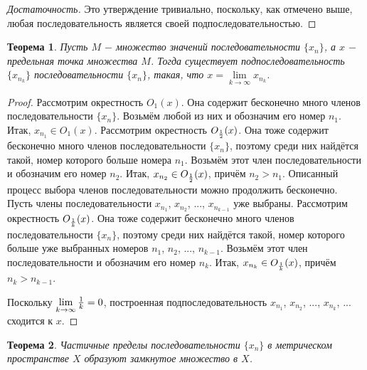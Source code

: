 \documentclass{article}
\newtheorem{theorem}{Теорема}[section]
\begin{document}
\begin{proof}[Достаточность]
Это утверждение тривиально, поскольку, как отмечено выше, любая последовательность является своей подпоследовательностью.
\end{proof}

\begin{theorem}
Пусть \(M\) \(-\) множество значений последовательности \(\{x_n\}\), а \(x\) \(-\) предельная точка множества \(M\). Тогда существует подпоследовательность \(\{x_{n_k}\}\) последовательности \(\{x_n\}\), такая, что \(x = \lim\limits_{k \to \infty} x_{n_k}\).
\end{theorem}

\begin{proof}
Рассмотрим окрестность \(O_1(x)\). Она содержит бесконечно много членов последовательности \(\{x_n\}\). Возьмём любой из них и обозначим его номер \(n_1\). Итак, \(x_{n_1} \in O_1(x)\). Рассмотрим окрестность \(O_{1 \over 2}(x)\). Она тоже содержит бесконечно много членов последовательности \(\{x_n\}\), поэтому среди них найдётся такой, номер которого больше номера \(n_1\). Возьмём этот член последовательности и обозначим его номер \(n_2\). Итак, \(x_{n_2} \in O_{1 \over 2}(x)\), причём \(n_2 > n_1\). Описанный процесс выбора членов последовательности можно продолжить бесконечно. Пусть члены последовательности \(x_{n_1}\), \(x_{n_2}\), ..., \(x_{n_{k - 1}}\) уже выбраны. Рассмотрим окрестность \(O_{1 \over k}(x)\). Она тоже содержит бесконечно много членов последовательности \(\{x_n\}\), поэтому среди них найдётся такой, номер которого больше уже выбранных номеров \(n_1\), \(n_2\), ..., \(n_{k - 1}\). Возьмём этот член последовательности и обозначим его номер \(n_k\). Итак, \(x_{n_k} \in O_{1 \over k}(x)\), причём \(n_k > n_{k - 1}\).

Поскольку \(\lim\limits_{k \to \infty}{1 \over k} = 0\), построенная подпоследовательность \(x_{n_1}\), \(x_{n_2}\), ..., \(x_{n_{k}}\), ... сходится к \(x\).
\end{proof}

\begin{theorem}
Частичные пределы последовательности \(\{x_n\}\) в метрическом пространстве \(X\) образуют замкнутое множество в \(X\).
\end{theorem}
\end{document}
